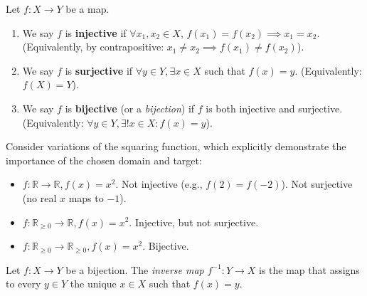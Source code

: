 \begin{definition}
Let $f: X \to Y$ be a map.
\begin{enumerate}
    \item We say $f$ is \textbf{injective} if $\forall x_1, x_2 \in X$, $f(x_1) = f(x_2) \implies x_1 = x_2$. (Equivalently, by contrapositive: $x_1 \ne x_2 \implies f(x_1) \ne f(x_2)$).
    \item We say $f$ is \textbf{surjective} if $\forall y \in Y, \exists x \in X$ such that $f(x) = y$. (Equivalently: $f(X) = Y$).
    \item We say $f$ is \textbf{bijective} (or a \textit{bijection}) if $f$ is both injective and surjective. (Equivalently: $\forall y \in Y, \exists! x \in X : f(x) = y$).
\end{enumerate}
\end{definition}

\begin{example}
Consider variations of the squaring function, which explicitly demonstrate the importance of the chosen domain and target:
\begin{itemize}
    \item $f: \mathbb{R} \to \mathbb{R}, f(x) = x^2$. Not injective (e.g., $f(2) = f(-2)$). Not surjective (no real $x$ maps to $-1$).
    \item $f: \mathbb{R}_{\ge 0} \to \mathbb{R}, f(x) = x^2$. Injective, but not surjective.
    \item $f: \mathbb{R}_{\ge 0} \to \mathbb{R}_{\ge 0}, f(x) = x^2$. Bijective.
\end{itemize}
\end{example}

\begin{definition}
Let $f: X \to Y$ be a bijection. The \textit{inverse map} $f^{-1}: Y \to X$ is the map that assigns to every $y \in Y$ the unique $x \in X$ such that $f(x) = y$.
\end{definition}

